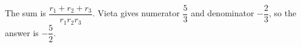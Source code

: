 The sum is $\dfrac{r_1+r_2+r_3}{r_1r_2r_3}$. Vieta gives numerator $\dfrac{5}{3}$ and denominator $-\dfrac{2}{3}$, so the answer is $\boxed{-\dfrac{5}{2}}$.
